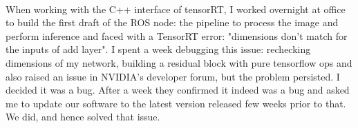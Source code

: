 \paragraph{}
When working with the C++ interface of tensorRT, I worked overnight at office to build the first draft of the ROS node: the pipeline to process the image and perform inference and faced with a TensorRT error: "dimensions don't match for the inputs of add layer". I spent a week debugging this issue: rechecking dimensions of my network, building a residual block with pure tensorflow ops and also raised an issue in NVIDIA's developer forum, but the problem persisted. I decided it was a bug.  After a week they confirmed it indeed was a bug and asked me to update our software to the latest version released few weeks prior to that. We did, and hence solved that issue.